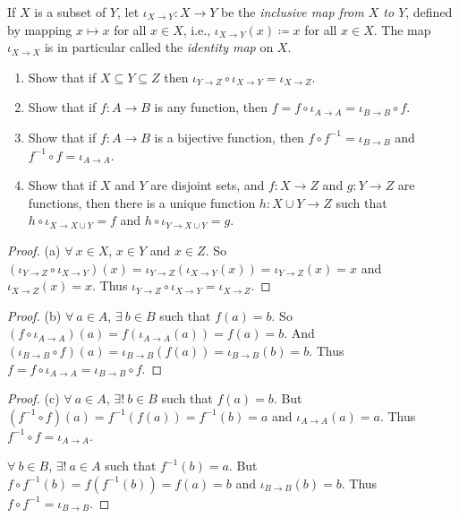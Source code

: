 \begin{exercise}\label{ex 3.3.8}
If \(X\) is a subset of \(Y\), let \(\iota_{X \to Y} : X \to Y\) be the \emph{inclusive map from \(X\) to \(Y\)}, defined by mapping \(x \mapsto x\) for all \(x \in X\), i.e., \(\iota_{X \to Y}(x) \coloneqq x\) for all \(x \in X\).
The map \(\iota_{X \to X}\) is in particular called the \emph{identity map} on \(X\).
\begin{enumerate}
    \item Show that if \(X \subseteq Y \subseteq Z\) then \(\iota_{Y \to Z} \circ \iota_{X \to Y} = \iota_{X \to Z}\).
    \item Show that if \(f : A \to B\) is any function, then \(f = f \circ \iota_{A \to A} = \iota_{B \to B} \circ f\).
    \item Show that if \(f : A \to B\) is a bijective function, then \(f \circ f^{-1} = \iota_{B \to B}\) and \(f^{-1} \circ f = \iota_{A \to A}\).
    \item Show that if \(X\) and \(Y\) are disjoint sets, and \(f : X \to Z\) and \(g : Y \to Z\) are functions, then there is a unique function \(h : X \cup Y \to Z\) such that \(h \circ \iota_{X \to X \cup Y} = f\) and \(h \circ \iota_{Y \to X \cup Y} = g\).
\end{enumerate}
\end{exercise}

\begin{proof}{(a)}
\(\forall\ x \in X\), \(x \in Y\) and \(x \in Z\).
So \((\iota_{Y \to Z} \circ \iota_{X \to Y})(x) = \iota_{Y \to Z}(\iota_{X \to Y}(x)) = \iota_{Y \to Z}(x) = x\) and \(\iota_{X \to Z}(x) = x\).
Thus \(\iota_{Y \to Z} \circ \iota_{X \to Y} = \iota_{X \to Z}\).
\end{proof}

\begin{proof}{(b)}
\(\forall\ a \in A\), \(\exists\ b \in B\) such that \(f(a) = b\).
So \((f \circ \iota_{A \to A})(a) = f(\iota_{A \to A}(a)) = f(a) = b\).
And \((\iota_{B \to B} \circ f)(a) = \iota_{B \to B}(f(a)) = \iota_{B \to B}(b) = b\).
Thus \(f = f \circ \iota_{A \to A} = \iota_{B \to B} \circ f\).
\end{proof}

\begin{proof}{(c)}
\(\forall\ a \in A\), \(\exists!\ b \in B\) such that \(f(a) = b\).
But \((f^{-1} \circ f)(a) = f^{-1}(f(a)) = f^{-1}(b) = a\) and \(\iota_{A \to A}(a) = a\).
Thus \(f^{-1} \circ f = \iota_{A \to A}\).

\(\forall\ b \in B\), \(\exists!\ a \in A\) such that \(f^{-1}(b) = a\).
But \(f \circ f^{-1}(b) = f(f^{-1}(b)) = f(a) = b\) and \(\iota_{B \to B}(b) = b\).
Thus \(f \circ f^{-1} = \iota_{B \to B}\).
\end{proof}

